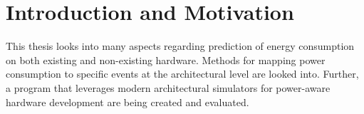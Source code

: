 \chapter{Introduction and Motivation}

This thesis looks into many aspects regarding prediction of energy consumption
on both existing and non-existing hardware. Methods for mapping power
consumption to specific events at the architectural level are looked into.
Further, a program that leverages modern architectural simulators for
power-aware hardware development are being created and evaluated.





